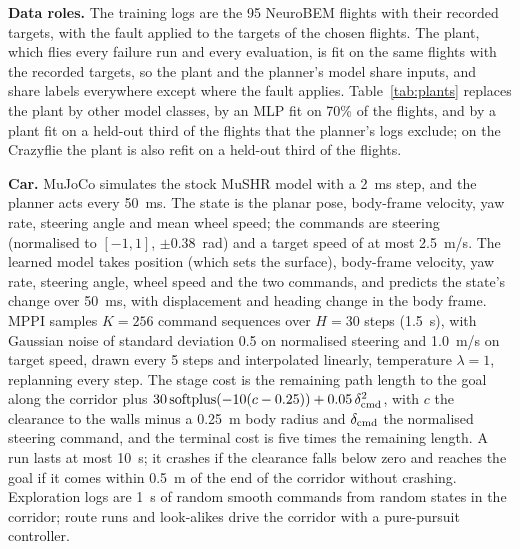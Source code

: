 \documentclass[preprint,12pt]{elsarticle}
\begin{document}
\textbf{Data roles.} The training logs are the 95 NeuroBEM flights with their recorded targets, with the fault applied to the targets of the chosen flights. The plant, which flies every failure run and every evaluation, is fit on the same flights with the recorded targets, so the plant and the planner's model share inputs, and share labels everywhere except where the fault applies. Table~\ref{tab:plants} replaces the plant by other model classes, by an MLP fit on 70\% of the flights, and by a plant fit on a held-out third of the flights that the planner's logs exclude; on the Crazyflie the plant is also refit on a held-out third of the flights.

\textbf{Car.} MuJoCo simulates the stock MuSHR model with a 2~ms step, and the planner acts every 50~ms. The state is the planar pose, body-frame velocity, yaw rate, steering angle and mean wheel speed; the commands are steering (normalised to $[-1,1]$, $\pm0.38$~rad) and a target speed of at most 2.5~m/s. The learned model takes position (which sets the surface), body-frame velocity, yaw rate, steering angle, wheel speed and the two commands, and predicts the state's change over 50~ms, with displacement and heading change in the body frame. MPPI samples $K=256$ command sequences over $H=30$ steps (1.5~s), with Gaussian noise of standard deviation 0.5 on normalised steering and 1.0~m/s on target speed, drawn every 5 steps and interpolated linearly, temperature $\lambda=1$, replanning every step. The stage cost is the remaining path length to the goal along the corridor plus $30\,\mathrm{softplus}(-10(c-0.25))+0.05\,\delta_{\rm cmd}^2$, with $c$ the clearance to the walls minus a 0.25~m body radius and $\delta_{\rm cmd}$ the normalised steering command, and the terminal cost is five times the remaining length. A run lasts at most 10~s; it crashes if the clearance falls below zero and reaches the goal if it comes within 0.5~m of the end of the corridor without crashing. Exploration logs are 1~s of random smooth commands from random states in the corridor; route runs and look-alikes drive the corridor with a pure-pursuit controller.
\end{document}
